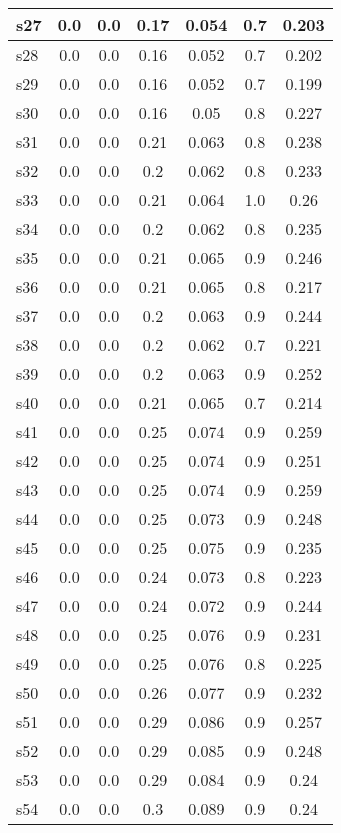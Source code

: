 \documentclass{article}
\begin{document}
\begin{tabular}{|l|c|c|c|c|c|c|}
\hline
s27 &0.0 & 0.0 & 0.17 & 0.054 & 0.7 & 0.203\\
\hline
s28 &0.0 & 0.0 & 0.16 & 0.052 & 0.7 & 0.202\\
\hline
s29 &0.0 & 0.0 & 0.16 & 0.052 & 0.7 & 0.199\\
\hline
s30 &0.0 & 0.0 & 0.16 & 0.05 & 0.8 & 0.227\\
\hline
s31 &0.0 & 0.0 & 0.21 & 0.063 & 0.8 & 0.238\\
\hline
s32 &0.0 & 0.0 & 0.2 & 0.062 & 0.8 & 0.233\\
\hline
s33 &0.0 & 0.0 & 0.21 & 0.064 & 1.0 & 0.26\\
\hline
s34 &0.0 & 0.0 & 0.2 & 0.062 & 0.8 & 0.235\\
\hline
s35 &0.0 & 0.0 & 0.21 & 0.065 & 0.9 & 0.246\\
\hline
s36 &0.0 & 0.0 & 0.21 & 0.065 & 0.8 & 0.217\\
\hline
s37 &0.0 & 0.0 & 0.2 & 0.063 & 0.9 & 0.244\\
\hline
s38 &0.0 & 0.0 & 0.2 & 0.062 & 0.7 & 0.221\\
\hline
s39 &0.0 & 0.0 & 0.2 & 0.063 & 0.9 & 0.252\\
\hline
s40 &0.0 & 0.0 & 0.21 & 0.065 & 0.7 & 0.214\\
\hline
s41 &0.0 & 0.0 & 0.25 & 0.074 & 0.9 & 0.259\\
\hline
s42 &0.0 & 0.0 & 0.25 & 0.074 & 0.9 & 0.251\\
\hline
s43 &0.0 & 0.0 & 0.25 & 0.074 & 0.9 & 0.259\\
\hline
s44 &0.0 & 0.0 & 0.25 & 0.073 & 0.9 & 0.248\\
\hline
s45 &0.0 & 0.0 & 0.25 & 0.075 & 0.9 & 0.235\\
\hline
s46 &0.0 & 0.0 & 0.24 & 0.073 & 0.8 & 0.223\\
\hline
s47 &0.0 & 0.0 & 0.24 & 0.072 & 0.9 & 0.244\\
\hline
s48 &0.0 & 0.0 & 0.25 & 0.076 & 0.9 & 0.231\\
\hline
s49 &0.0 & 0.0 & 0.25 & 0.076 & 0.8 & 0.225\\
\hline
s50 &0.0 & 0.0 & 0.26 & 0.077 & 0.9 & 0.232\\
\hline
s51 &0.0 & 0.0 & 0.29 & 0.086 & 0.9 & 0.257\\
\hline
s52 &0.0 & 0.0 & 0.29 & 0.085 & 0.9 & 0.248\\
\hline
s53 &0.0 & 0.0 & 0.29 & 0.084 & 0.9 & 0.24\\
\hline
s54 &0.0 & 0.0 & 0.3 & 0.089 & 0.9 & 0.24\\
\hline

\end{tabular}
\end{document}
